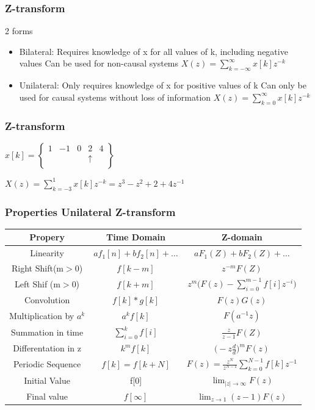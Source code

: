 \begin{frame}
	\frametitle{Z-transform}
	\begin{block}{2 forms}
			\begin{itemize}
				
				\item Bilateral:
				Requires knowledge of x for all values of k, including negative values
				Can be used for non-causal systems $X(z) = \sum\limits_{k=-\infty}^{\infty} x[k]z^{-k}$
				\item 	Unilateral:
				Only requires knowledge of x for positive values of k
				Can only be used for causal systems without loss of information $X(z) = \sum\limits_{k=0}^{\infty} x[k]z^{-k}$
			\end{itemize}
	\end{block}


\end{frame}
\begin{frame}
	\frametitle{Z-transform}
		\begin{example}
			\begin{center}
				
				$x[k] = \begin{Bmatrix}
				1 & - 1 & 0 & 2 & 4\\
				&     &   & \uparrow & \\
				\end{Bmatrix}$
			\end{center}
			\begin{center}
				$X(z) = \sum\limits_{k=-3}^{1}x[k]z^{-k} = z^3 -z^2 +2 + 4z^{-1}$
			\end{center}
		\end{example}	
\end{frame}
\begin{frame}
	\frametitle{Properties Unilateral Z-transform}
	\small{
		\begin{tabular}{|c|c|c|}
			\hline  Propery & Time Domain & Z-domain  \\ 
			\hline  Linearity & $af_1[n]+bf_2[n] + \dots  $& $aF_1(Z)+bF_2(Z)+\dots$ \\ 
			\hline  Right Shift(m$>$0)& $f[k-m]$  &$z^{-m}F(Z)$  \\ 
			\hline  Left Shif (m$>$0)& $f[k+m] $  & $ z^m\bigg(F(z)-\sum\limits_{i=0}^{m-1}f[i]z^{-i} \bigg)$ \\ 
			\hline  Convolution & $f[k]\ast g[k] $  & $F(z)G(z) $ \\ 
			\hline  Multiplication by $a^{k}$ & $a^{k}f[k]$  & $F(a^{-1}z)$  \\ 
			\hline  Summation in time& $\sum\limits_{i=0}^{k}f[i]$  & $\frac{z}{z-1}F(Z) $\\ 
			\hline  Differentation in z& $k^mf[k]$ & $\big(-z \frac{d}{d}\big)^{m} F(z)$ \\ 
			\hline  Periodic Sequence & $f[k] = f[k+N]$  & $F(z) = \frac{z^N}{z^{N-1}}\sum\limits_{k=0}^{N-1}f[k]z^{-1}$  \\ 
			\hline  Initial Value& f[0] &$ \lim_{\mid z \mid \to \infty} F(z) $  \\ 
			\hline  Final value & $f[\infty] $ & $\lim_{z \to 1} (z-1)F(z) $ \\ 
			\hline 
		\end{tabular} }
\end{frame}
